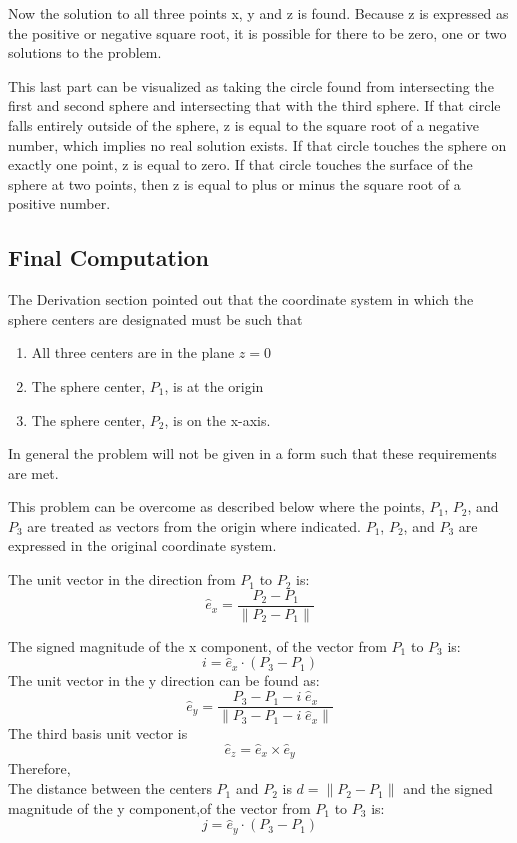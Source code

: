 Now the solution to all three points x, y and z is found. Because z is expressed as the positive or negative square root, it is possible for there to be zero, one or two solutions to the problem.

This last part can be visualized as taking the circle found from intersecting the first and second sphere and intersecting that with the third sphere. If that circle falls entirely outside of the sphere, z is equal to the square root of a negative number, which implies no real solution exists. If that circle touches the sphere on exactly one point, z is equal to zero. If that circle touches the surface of the sphere at two points, then z is equal to plus or minus the square root of a positive number.

\subsection{Final Computation}

The Derivation section pointed out that the coordinate system in which the sphere centers are designated must be such that
\begin{enumerate}
	\item All three centers are in the plane $z=0$
	\item The sphere center, $P_1$, is at the origin
	\item The sphere center, $P_2$, is on the x-axis.
\end{enumerate}
In general the problem will not be given in a form such that these requirements are met.

This problem can be overcome as described below where the points, $P_1$, $P_2$, and $P_3$ are treated as vectors from the origin where indicated. $P_1$, $P_2$, and $P_3$ are expressed in the original coordinate system.

The unit vector in the direction from $P_1$ to $P_2$ is:
\begin{equation}
\hat e_x = \frac{ P_2 - P_1 }{ \| P_2 - P_1 \| } \nonumber
\end{equation}

The signed magnitude of the x component, of the vector from $P_1$ to $P_3$ is:
\begin{equation}
i = \hat e_x \cdot ( P_3 - P_1 )  \nonumber
\end{equation}
The unit vector in the y direction can be found as:
\begin{equation}
\hat e_y = \frac{ P_3 - P_1 - i \; \hat e_x}{ \| P_3 - P_1 - i \; \hat e_x \| } \nonumber
\end{equation}
The third basis unit vector is 
\begin{equation}
\hat e_z = \hat e_x \times \hat e_y \nonumber
\end{equation}
Therefore, \\
The distance between the centers $P_1$ and $P_2$ is $d = \| P_2 - P_1 \|$  and the signed magnitude of the y component,of the vector from $P_1$ to $P_3$ is:
\begin{equation}
j = \hat e_y \cdot ( P_3 - P_1 ) \nonumber
\end{equation}


